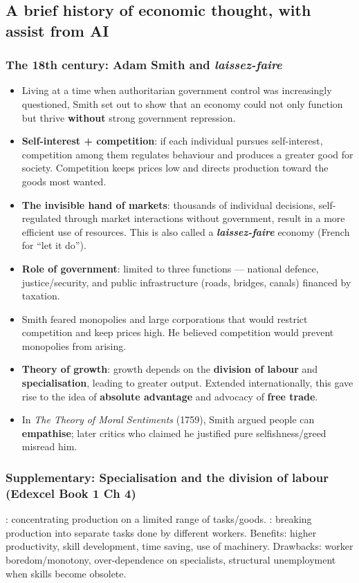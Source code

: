 \subsection{A brief history of economic thought, with assist from AI}
\subsubsection*{The 18th century: Adam Smith and \textit{laissez-faire}}
\begin{itemize}
  \item Living at a time when authoritarian government control was increasingly questioned, Smith set out to show that an economy could not only function but thrive \textbf{without} strong government repression.
  \item \textbf{Self-interest + competition}: if each individual pursues self-interest, competition among them regulates behaviour and produces a greater good for society. Competition keeps prices low and directs production toward the goods most wanted.
  \item \textbf{The invisible hand of markets}: thousands of individual decisions, self-regulated through market interactions without government, result in a more efficient use of resources. This is also called a \textbf{\textit{laissez-faire}} economy (French for ``let it do'').
  \item \textbf{Role of government}: limited to three functions --- national defence, justice/security, and public infrastructure (roads, bridges, canals) financed by taxation.
  \item Smith feared monopolies and large corporations that would restrict competition and keep prices high. He believed competition would prevent monopolies from arising.
  \item \textbf{Theory of growth}: growth depends on the \textbf{division of labour} and \textbf{specialisation}, leading to greater output. Extended internationally, this gave rise to the idea of \textbf{absolute advantage} and advocacy of \textbf{free trade}.
  \item In \textit{The Theory of Moral Sentiments} (1759), Smith argued people can \textbf{empathise}; later critics who claimed he justified pure selfishness/greed misread him.
\end{itemize}
\subsubsection*{Supplementary: Specialisation and the division of labour (Edexcel Book 1 Ch 4)}
: concentrating production on a limited range of tasks/goods. : breaking production into separate tasks done by different workers. Benefits: higher productivity, skill development, time saving, use of machinery. Drawbacks: worker boredom/monotony, over-dependence on specialists, structural unemployment when skills become obsolete.

